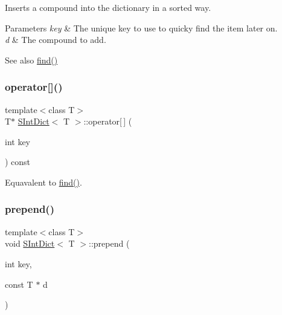 Inserts a compound into the dictionary in a sorted way. 
\begin{DoxyParams}{Parameters}
{\em key} & The unique key to use to quicky find the item later on. \\
\hline
{\em d} & The compound to add. \\
\hline
\end{DoxyParams}
\begin{DoxySeeAlso}{See also}
\mbox{\hyperlink{class_s_int_dict_a5b08deebe24072f66bdce4fed2a3863d}{find()}} 
\end{DoxySeeAlso}
\mbox{\label{class_s_int_dict_aca2cf7030f2e469f1d7dfe8eaaa178f7}} 
\subsubsection{\texorpdfstring{operator[]()}{operator[]()}}
{\footnotesize\ttfamily template$<$class T$>$ \\
T$\ast$ \mbox{\hyperlink{class_s_int_dict}{S\+Int\+Dict}}$<$ T $>$\+::operator\mbox{[}$\,$\mbox{]} (\begin{DoxyParamCaption}\item[{int}]{key }\end{DoxyParamCaption}) const\hspace{0.3cm}{\ttfamily [inline]}}

Equavalent to \mbox{\hyperlink{class_s_int_dict_a5b08deebe24072f66bdce4fed2a3863d}{find()}}. \mbox{\label{class_s_int_dict_a394582f93d6d758a477e86f84087c6a6}} 
\subsubsection{\texorpdfstring{prepend()}{prepend()}}
{\footnotesize\ttfamily template$<$class T$>$ \\
void \mbox{\hyperlink{class_s_int_dict}{S\+Int\+Dict}}$<$ T $>$\+::prepend (\begin{DoxyParamCaption}\item[{int}]{key,  }\item[{const T $\ast$}]{d }\end{DoxyParamCaption})\hspace{0.3cm}{\ttfamily [inline]}}

